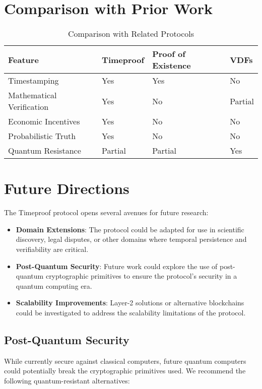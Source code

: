 \documentclass[12pt]{report}
\begin{document}
\section{Comparison with Prior Work}

\begin{table}[h]
\centering
\caption{Comparison with Related Protocols}
\begin{tabular}{|l|l|l|l|}
\hline
\textbf{Feature} & \textbf{Timeproof} & \textbf{Proof of Existence} & \textbf{VDFs} \\
\hline
Timestamping & Yes & Yes & No \\
Mathematical Verification & Yes & No & Partial \\
Economic Incentives & Yes & No & No \\
Probabilistic Truth & Yes & No & No \\
Quantum Resistance & Partial & Partial & Yes \\
\hline
\end{tabular}
\end{table}

\section{Future Directions}
The Timeproof protocol opens several avenues for future research:
\begin{itemize}
    \item \textbf{Domain Extensions}: The protocol could be adapted for use in scientific discovery, legal disputes, or other domains where temporal persistence and verifiability are critical.
    \item \textbf{Post-Quantum Security}: Future work could explore the use of post-quantum cryptographic primitives to ensure the protocol's security in a quantum computing era.
    \item \textbf{Scalability Improvements}: Layer-2 solutions or alternative blockchains could be investigated to address the scalability limitations of the protocol.
\end{itemize}

\subsection{Post-Quantum Security}
While currently secure against classical computers, future quantum computers could potentially break the cryptographic primitives used. We recommend the following quantum-resistant alternatives:
\end{document}
